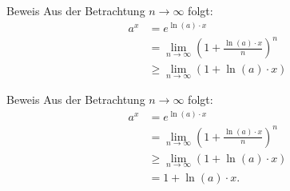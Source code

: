 \documentclass[10pt]{beamer}
\begin{document}
\begin{frame}{Beweis}
    Aus der Betrachtung \( n \to \infty \) folgt:
    \begin{align*}
        a^{x}
        & = e^{\ln( a ) \cdot x} \\
        & = \lim_{n \to \infty} \left( 1 + \frac{\ln( a ) \cdot x}{n} \right)^{n} \\
        & \geq \lim_{n \to \infty} \left( 1 + \ln( a ) \cdot x \right)
    \end{align*}
\end{frame}



\begin{frame}{Beweis}
    Aus der Betrachtung \( n \to \infty \) folgt:
    \begin{align*}
        a^{x}
        & = e^{\ln( a ) \cdot x} \\
        & = \lim_{n \to \infty} \left( 1 + \frac{\ln( a ) \cdot x}{n} \right)^{n} \\
        & \geq \lim_{n \to \infty} \left( 1 + \ln( a ) \cdot x \right) \\
        & = 1 + \ln( a ) \cdot x.
    \end{align*}
\end{frame}
\end{document}
